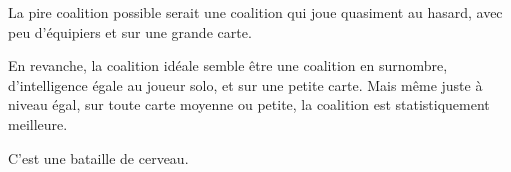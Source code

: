\begin{result}
	La pire coalition possible serait une coalition qui joue quasiment au hasard, avec peu d'équipiers et sur une grande carte.
	
	En revanche, la coalition idéale semble être une coalition en surnombre, d'intelligence égale au joueur solo, et sur une petite carte. Mais même juste à niveau égal, sur toute carte moyenne ou petite, la coalition est statistiquement meilleure. 
	
	C'est une bataille de cerveau.
\end{result}

